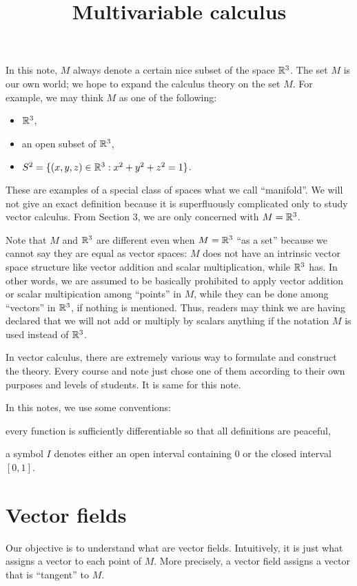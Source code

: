 \documentclass{../exp}
\title{Multivariable calculus}
\begin{document}
\maketitle
\tableofcontents





In this note, $M$ always denote a certain nice subset of the space $\mathbb{R}^3$.
The set $M$ is our own world; we hope to expand the calculus theory on the set $M$.
For example, we may think $M$ as one of the following:
\begin{itemize}
\item $\mathbb{R}^3$,
\item an open subset of $\mathbb{R}^3$,
\item $S^2=\{(x,y,z)\in\mathbb{R}^3:x^2+y^2+z^2=1\}$.
\end{itemize}
These are examples of a special class of spaces what we call ``manifold''.
We will not give an exact definition because it is superfluously complicated only to study vector calculus.
From Section 3, we are only concerned with $M=\mathbb{R}^3$.

Note that $M$ and $\mathbb{R}^3$ are different even when $M=\mathbb{R}^3$ ``as a set'' because we cannot say they are equal as vector spaces: $M$ does not have an intrinsic vector space structure like vector addition and scalar multiplication, while $\mathbb{R}^3$ has.
In other words, we are assumed to be basically prohibited to apply vector addition or scalar multipication among ``points'' in $M$, while they can be done among ``vectors'' in $\mathbb{R}^3$, if nothing is mentioned.
Thus, readers may think we are having declared that we will not add or multiply by scalars anything if the notation $M$ is used instead of $\mathbb{R}^3$.

In vector calculus, there are extremely various way to formulate and construct the theory.
Every course and note just chose one of them according to their own purposes and levels of students.
It is same for this note.

In this notes, we use some conventions:
\begin{cond}
\item every function is sufficiently differentiable so that all definitions are peaceful,
\item a symbol $I$ denotes either an open interval containing 0 or the closed interval $[0,1]$.
\end{cond}


\section{Vector fields}
Our objective is to understand what are vector fields.
Intuitively, it is just what assigns a vector to each point of $M$.
More precisely, a vector field assigns a vector that is ``tangent'' to $M$.
\end{document}
